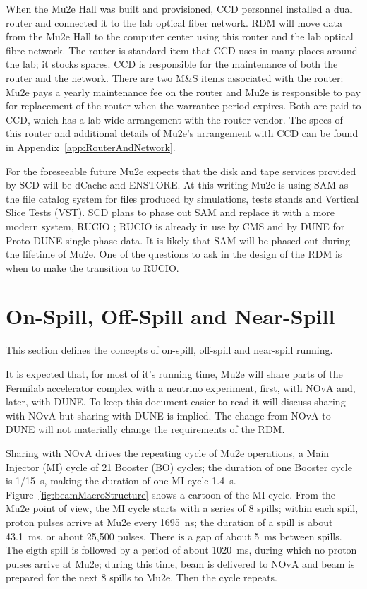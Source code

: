 When the Mu2e Hall was built and provisioned, CCD personnel installed a dual router
and connected it to the lab optical fiber network.
RDM will move data from the Mu2e Hall
to the computer center using this router and the lab optical fibre network.
The router is standard item that CCD uses in many places around the lab; it stocks spares.
CCD is responsible for the maintenance of both the router and the network.
There are two M\&S items associated with the router: Mu2e pays a yearly
maintenance fee on the router and Mu2e is responsible to pay for replacement
of the router when the warrantee period expires.  Both are paid to CCD,
which has a lab-wide arrangement with the router vendor.
The specs of this router and additional details of Mu2e's arrangement with CCD
can be found in Appendix~\ref{app:RouterAndNetwork}.

For the foreseeable future Mu2e expects that the disk and tape services provided
by SCD will be dCache and ENSTORE.
At this writing Mu2e is using SAM as the file catalog system for files produced
by simulations, tests stands and Vertical Slice Tests (VST).
SCD plans to phase out SAM and replace it with a more modern system, RUCIO ;
RUCIO is already in use by CMS and by DUNE for Proto-DUNE single phase data.
It is likely that SAM will be phased out during the lifetime of Mu2e.
One of the questions to ask in the design of the RDM is
when to make the transition to RUCIO.

\section{On-Spill, Off-Spill and Near-Spill}

This section defines the concepts of on-spill, off-spill and near-spill running.

It is expected that, for most of it's running time,
Mu2e will share parts of the Fermilab accelerator complex with a neutrino experiment,
first, with NOvA and, later, with DUNE.
To keep this document easier to read it will discuss sharing with NOvA but sharing with DUNE is implied.
The change from NOvA to DUNE will not materially change the requirements of the RDM.

Sharing with NOvA drives the repeating cycle of Mu2e operations, a Main Injector (MI) cycle of
21 Booster (BO) cycles;
the duration of one Booster cycle is 1/15~s,
making the duration of one MI cycle 1.4~s.
Figure~\ref{fig:beamMacroStructure} shows a cartoon of the MI cycle.
From the Mu2e point of view, the MI cycle starts with a series of 8 spills;
within each spill, proton pulses arrive at Mu2e every 1695~ns;
the duration of a spill is about 43.1~ms, or about 25,500 pulses.
There is a gap of about 5~ms between spills.
The eigth spill is followed by a period of about 1020~ms,
during which no proton pulses arrive at Mu2e;
during this time, beam is delivered to NOvA
and beam is prepared for the next 8 spills to Mu2e.
Then the cycle repeats.

